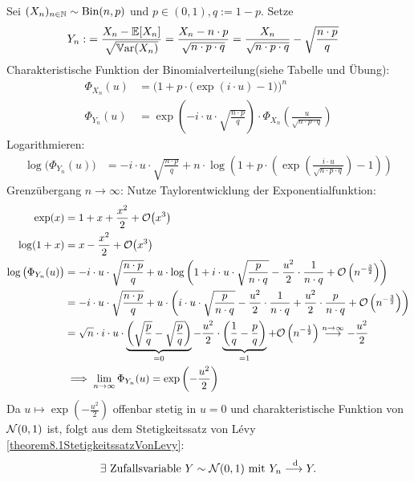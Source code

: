 \begin{beisp}\enter
	Sei $(X_n)_{n\in\mathbb{N}}\sim\operatorname{Bin}(n,p)$ und $p\in(0,1),q:=1-p$. Setze
	\begin{align*}
		Y_n:
		&=\frac{X_n-\mathbb{E}[X_n]}{\sqrt{\mathbb{V}\text{ar}(X_n)}}
		=\frac{X_n-n\cdot p}{\sqrt{n\cdot p\cdot q}}
		=\frac{X_n}{\sqrt{n\cdot p\cdot q}}-\sqrt{\frac{n\cdot p}{q}}
	\end{align*}
	Charakteristische Funktion der Binomialverteilung(siehe Tabelle und Übung):
	\begin{align*}
		\Phi_{X_n}(u)
		&=\Big(1+p\cdot\big(\exp(i\cdot u)-1\big)\Big)^n\\
		\Phi_{Y_n}(u)
		&=\exp\left(-i\cdot u\cdot\sqrt{\frac{n\cdot p}{q}}\right)\cdot\Phi_{X_n}\left(\frac{u}{\sqrt{n\cdot p\cdot q}}\right)
	\end{align*}
	Logarithmieren:
	\begin{align*}
		\log\big(\Phi_{Y_n}(u)\big)
		&=-i\cdot u\cdot\sqrt{\frac{n\cdot p}{q}}+n\cdot\log\left(1+p\cdot\left(\exp\left(\frac{i\cdot u}{\sqrt{n\cdot p\cdot q}}\right)-1\right)\right) 
	\end{align*}
	Grenzübergang $n\to\infty$: Nutze Taylorentwicklung der Exponentialfunktion:
	\begin{align*}
		\exp(x)
		&=1+x+\frac{x^2}{2}+\mathcal{O}\big(x^3\big)\\
		\log(1+x)
		&=x-\frac{x^2}{2}+\mathcal{O}\big(x^3\big)\\
		\log\big(\Phi_{Y_n}(u)\big)
		&=-i\cdot u\cdot\sqrt{\frac{n\cdot p}{q}}+u\cdot\log\left(1+i\cdot u\cdot\sqrt{\frac{p}{n\cdot q}}-\frac{u^2}{2}\cdot\frac{1}{n\cdot q}+\mathcal{O}\left(n^{-\frac{3}{2}}\right)\right)\\
		&=-i\cdot u\cdot\sqrt{\frac{n\cdot p}{q}}+u\cdot\left(i\cdot u\cdot\sqrt{\frac{p}{n\cdot q}}-\frac{u^2}{2}\cdot\frac{1}{n\cdot q}+\frac{u^2}{2}\cdot\frac{p}{n\cdot q}+\mathcal{O}\left(n^{-\frac{3}{2}}\right)\right)\\
		&=\sqrt{n}\cdot i\cdot u\cdot\underbrace{\left(\sqrt{\frac{p}{q}}-\sqrt{\frac{p}{q}}\right)}_{=0}-\frac{u^2}{2}\cdot\underbrace{\left(\frac{1}{q}-\frac{p}{q}\right)}_{=1}+\mathcal{O}\left(n^{-\frac{1}{2}}\right)
		\overset{n\to\infty}{\longrightarrow}-\frac{u^2}{2}\\
		&\implies
		\lim\limits_{n\to\infty}\Phi_{Y_n}(u)=\exp\left(-\frac{u^2}{2}\right)
	\end{align*}
	Da $u\mapsto\exp\left(-\frac{u^2}{2}\right)$ offenbar stetig in $u=0$ und charakteristische Funktion von $\mathcal{N}(0,1)$ ist, folgt aus dem Stetigkeitssatz von Lévy \ref{theorem8.1StetigkeitssatzVonLevy}:
	\begin{align*}
		\exists\text{ Zufallsvariable }Y\sim\mathcal{N}(0,1)\text{ mit } Y_n\overset{\text{ d}}{\longrightarrow}Y.
	\end{align*}
\end{beisp}

